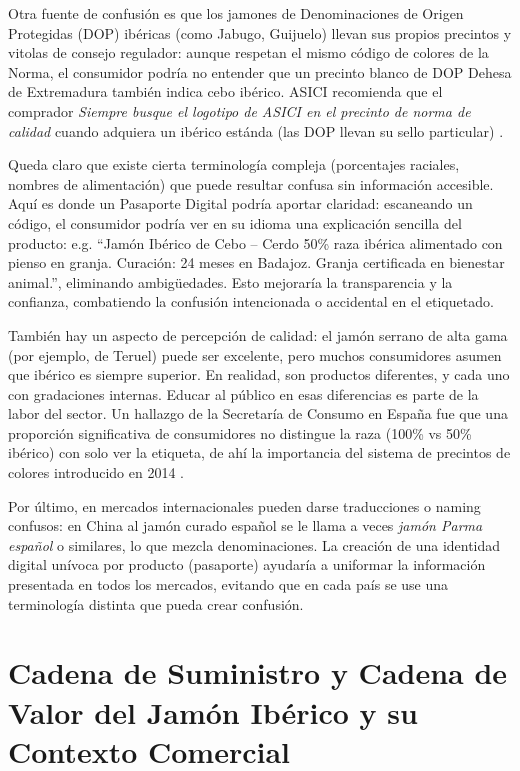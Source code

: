 Otra fuente de confusión es que los jamones de Denominaciones de Origen Protegidas (DOP) ibéricas (como Jabugo, Guijuelo) llevan sus propios precintos y vitolas de consejo regulador: aunque respetan el mismo código de colores de la Norma, el consumidor podría no entender que un precinto blanco de DOP Dehesa de Extremadura también indica cebo ibérico. ASICI recomienda que el comprador \textit{Siempre busque el logotipo de ASICI en el precinto de norma de calidad} cuando adquiera un ibérico estánda (las DOP llevan su sello particular) \cite{noauthor_precintos_nodate}\cite{ministerio_de_agricultura_alimentacion_y_medio_ambiente_real_2014}.

Queda claro que existe cierta terminología compleja (porcentajes raciales, nombres de alimentación) que puede resultar confusa sin información accesible. Aquí es donde un Pasaporte Digital podría aportar claridad: escaneando un código, el consumidor podría ver en su idioma una explicación sencilla del producto: e.g. “Jamón Ibérico de Cebo – Cerdo 50\% raza ibérica alimentado con pienso en granja. Curación: 24 meses en Badajoz. Granja certificada en bienestar animal.”, eliminando ambigüedades. Esto mejoraría la transparencia y la confianza, combatiendo la confusión intencionada o accidental en el etiquetado.

También hay un aspecto de percepción de calidad: el jamón serrano de alta gama (por ejemplo, de Teruel) puede ser excelente, pero muchos consumidores asumen que ibérico es siempre superior. En realidad, son productos diferentes, y cada uno con gradaciones internas. Educar al público en esas diferencias es parte de la labor del sector. Un hallazgo de la Secretaría de Consumo en España fue que una proporción significativa de consumidores no distingue la raza (100\% vs 50\% ibérico) con solo ver la etiqueta, de ahí la importancia del sistema de precintos de colores introducido en 2014 \cite{noauthor_consumo_2022}.

Por último, en mercados internacionales pueden darse traducciones o naming confusos: en China al jamón curado español se le llama a veces \textit{jamón Parma español} o similares, lo que mezcla denominaciones. La creación de una identidad digital unívoca por producto (pasaporte) ayudaría a uniformar la información presentada en todos los mercados, evitando que en cada país se use una terminología distinta que pueda crear confusión.

\section{Cadena de Suministro y Cadena de Valor del Jamón Ibérico y su Contexto Comercial}\label{sec:intro-cadena}

